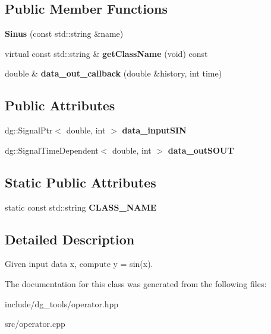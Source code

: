 \subsection*{Public Member Functions}
\begin{DoxyCompactItemize}
\item 
{\bfseries Sinus} (const std\+::string \&name)\hypertarget{classdg__tools_1_1Sinus_a8d140f28cc05cedf44dd759fd19c0d53}{}\label{classdg__tools_1_1Sinus_a8d140f28cc05cedf44dd759fd19c0d53}

\item 
virtual const std\+::string \& {\bfseries get\+Class\+Name} (void) const \hypertarget{classdg__tools_1_1Sinus_ac87645cfb286da4a5b4c3523d69e02c9}{}\label{classdg__tools_1_1Sinus_ac87645cfb286da4a5b4c3523d69e02c9}

\item 
double \& {\bfseries data\+\_\+out\+\_\+callback} (double \&history, int time)\hypertarget{classdg__tools_1_1Sinus_a6148a36649f568751563d52e09687459}{}\label{classdg__tools_1_1Sinus_a6148a36649f568751563d52e09687459}

\end{DoxyCompactItemize}
\subsection*{Public Attributes}
\begin{DoxyCompactItemize}
\item 
dg\+::\+Signal\+Ptr$<$ double, int $>$ {\bfseries data\+\_\+input\+S\+IN}\hypertarget{classdg__tools_1_1Sinus_a0d1afb51099604b472d7cc0029c38f7b}{}\label{classdg__tools_1_1Sinus_a0d1afb51099604b472d7cc0029c38f7b}

\item 
dg\+::\+Signal\+Time\+Dependent$<$ double, int $>$ {\bfseries data\+\_\+out\+S\+O\+UT}\hypertarget{classdg__tools_1_1Sinus_ac0ae9557416fdf0d1afb0a31471e0553}{}\label{classdg__tools_1_1Sinus_ac0ae9557416fdf0d1afb0a31471e0553}

\end{DoxyCompactItemize}
\subsection*{Static Public Attributes}
\begin{DoxyCompactItemize}
\item 
static const std\+::string {\bfseries C\+L\+A\+S\+S\+\_\+\+N\+A\+ME}\hypertarget{classdg__tools_1_1Sinus_ad7933351d7b29f1331f6fad034f16212}{}\label{classdg__tools_1_1Sinus_ad7933351d7b29f1331f6fad034f16212}

\end{DoxyCompactItemize}


\subsection{Detailed Description}
Given input data x, compute y = sin(x). 

The documentation for this class was generated from the following files\+:\begin{DoxyCompactItemize}
\item 
include/dg\+\_\+tools/operator.\+hpp\item 
src/operator.\+cpp\end{DoxyCompactItemize}
